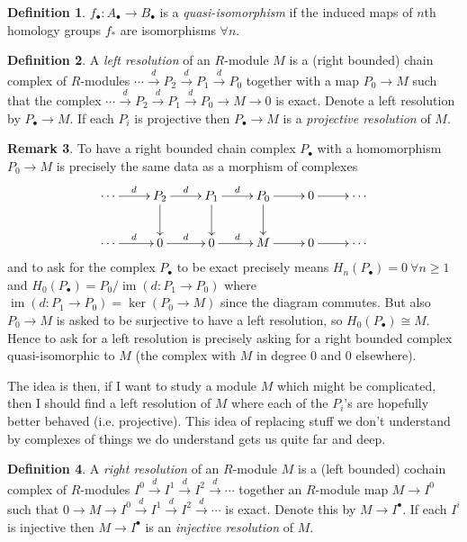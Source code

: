 \documentclass{article}
\newcommand{\im}{\operatorname{im}}
\theoremstyle{definition}
\newtheorem{defn}{Definition}[subsection]
\newtheorem{remark}[defn]{Remark}
\begin{document}
\begin{defn}
$f_\bullet:A_\bullet\rightarrow B_\bullet$ is a \textit{quasi-isomorphism} if the induced maps of $n$th homology groups $f_\ast$ are isomorphisms $\forall n$.
\end{defn}

\begin{defn}
A \textit{left resolution} of an $R$-module $M$ is a (right bounded) chain complex of $R$-modules $\cdots\xrightarrow{d}P_2\xrightarrow{d}P_1\xrightarrow{d}P_0$ together with a map $P_0\rightarrow M$ such that the complex $\cdots\xrightarrow{d}P_2\xrightarrow{d}P_1\xrightarrow{d}P_0\rightarrow M\rightarrow 0$ is exact. Denote a left resolution by $P_\bullet\rightarrow M$. If each $P_i$ is projective then $P_\bullet\rightarrow M$ is a \textit{projective resolution} of $M$.
\end{defn}

\begin{remark}
To have a right bounded chain complex $P_\bullet$ with a homomorphism $P_0\rightarrow M$ is precisely the same data as a morphism of complexes
\[
\xymatrix{
\cdots\ar[r]^d & P_2\ar[r]^d\ar[d] & P_1\ar[r]^d\ar[d] & P_0\ar[r]\ar[d] & 0 \ar[r] & \cdots \\
\cdots\ar[r]^d & 0\ar[r]^d & 0\ar[r]^d & M\ar[r] & 0 \ar[r] & \cdots \\
}
\]
and to ask for the complex $P_\bullet$ to be exact precisely means $H_n(P_\bullet)=0 \ \forall n\geq 1$ and $H_0(P_\bullet)=P_0/\im(d:P_1\rightarrow P_0)$ where $\im(d:P_1\rightarrow P_0)=\ker(P_0\rightarrow M)$ since the diagram commutes. But also $P_0\rightarrow M$ is asked to be surjective to have a left resolution, so $H_0(P_\bullet)\cong M$. Hence to ask for a left resolution is precisely asking for a right bounded complex quasi-isomorphic to $M$ (the complex with $M$ in degree 0 and 0 elsewhere).

The idea is then, if I want to study a module $M$ which might be complicated, then I should find a left resolution of $M$ where each of the $P_i$'s are hopefully better behaved (i.e. projective). This idea of replacing stuff we don't understand by complexes of things we do understand gets us quite far and deep.
\end{remark}

\begin{defn}
A \textit{right resolution} of an $R$-module $M$ is a (left bounded) cochain complex of $R$-modules $I^0\xrightarrow{d}I^1\xrightarrow{d}I^2\xrightarrow{d}\cdots$ together an $R$-module map $M\rightarrow I^0$ such that $0\rightarrow M\rightarrow I^0\xrightarrow{d}I^1\xrightarrow{d}I^2\xrightarrow{d}\cdots$ is exact. Denote this by $M\rightarrow I^\bullet$. If each $I^i$ is injective then $M\rightarrow I^\bullet$ is an \textit{injective resolution} of $M$.
\end{defn}
\end{document}
